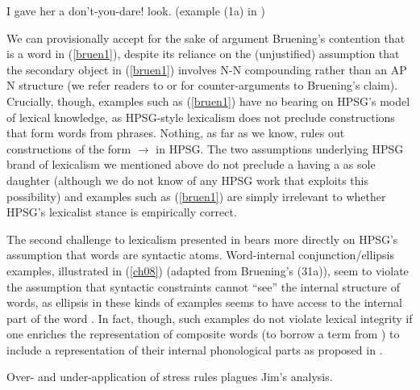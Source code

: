 \documentclass[output=paper]{langsci/langscibook}
\begin{document}
\begin{exe}
	\ex\label{bruen1} I gave her a don't-you-dare! look. (example (1a) in \citealt{Bruening2018})
\end{exe}

We can provisionally accept for the sake of argument Bruening's contention that  is a word in (\ref{bruen1}), despite its reliance on the (unjustified) assumption that the secondary object in (\ref{bruen1}) involves N-N compounding rather than an AP N structure (we refer readers to \citet{BresnanandMchombo1995} or \citet{MuellerPersian} for counter-arguments to Bruening's claim). Crucially, though, examples such as (\ref{bruen1}) have no bearing on HPSG's model of lexical knowledge, as HPSG-style lexicalism does not preclude constructions that form words from phrases. Nothing, as far as we know, rules out constructions of the form  $\rightarrow$  in HPSG. The two assumptions underlying HPSG brand of lexicalism we mentioned above do not preclude a  having a  as sole daughter (although we do not know of any HPSG work that exploits this possibility) and examples such as (\ref{bruen1}) are simply irrelevant to whether HPSG's lexicalist stance is empirically correct.

The second challenge to lexicalism presented in \citet{Bruening2018} bears more directly on HPSG's assumption that words are syntactic atoms. Word-internal conjunction/ellipsis examples, illustrated in (\ref{ch08}) (adapted from Bruening's (31a)), seem to violate the assumption that syntactic constraints cannot ``see'' the internal structure of words, as ellipsis in these kinds of examples seems to have access to the internal part of the word . In fact, though, such examples do not violate lexical integrity if one enriches the representation of composite words (to borrow a term from \citealt{Anderson1992}) to include a representation of their internal phonological parts as proposed in \citet{Chaves2008,Chaves2014}.

\begin{exe}
	\ex\label{ch08}Over- and under-application of stress rules plagues Jim's analysis.
\end{exe} 
\end{document}
